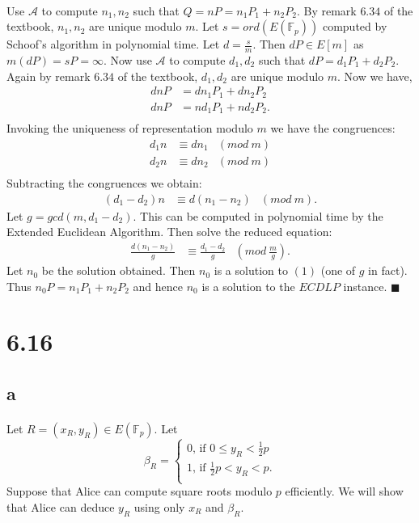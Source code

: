 \documentclass[letterpaper,12pt,oneside,onecolumn]{report}
\begin{document}
\paragraph{}
Use $\mathcal{A}$ to compute $n_1, n_2$ such that $Q = nP = n_1P_1 + n_2P_2$. By remark $6.34$ of the textbook, $n_1, n_2$ are unique modulo $m$. Let $s = ord(E(\mathbb{F}_p))$ computed by Schoof's algorithm in polynomial time. Let $d = \frac{s}{m}$. Then $dP \in E[m]$ as $m(dP) = sP = \infty$. Now use $\mathcal{A}$ to compute $d_1, d_2$ such that $dP = d_1P_1 + d_2P_2$. Again by remark $6.34$ of the textbook, $d_1, d_2$ are unique modulo $m$. Now we have,
\begin{align*}
dnP &= dn_1P_1 + dn_2P_2 \\
dnP &= nd_1P_1 + nd_2P_2.\\
\end{align*}
Invoking the uniqueness of representation modulo $m$ we have the congruences:
\begin{align*}
d_1n &\equiv dn_1 &(mod\ m)\\
d_2n &\equiv dn_2 &(mod\ m)\\
\end{align*}
Subtracting the congruences we obtain:
\begin{align}
(d_1 - d_2)n &\equiv d(n_1-n_2) &(mod\ m).
\end{align}
Let $g = gcd(m, d_1-d_2)$. This can be computed in polynomial time by the Extended Euclidean Algorithm. Then solve the reduced equation:
\begin{align*}
\frac{d(n_1 - n_2)}{g} &\equiv \frac{d_1 - d_2}{g} &(mod\ \frac{m}{g}).
\end{align*}
Let $n_0$ be the solution obtained. Then $n_0$ is a solution to $(1)$ (one of $g$ in fact). Thus $n_0P = n_1P_1 + n_2P_2$ and hence $n_0$ is a solution to the $ECDLP$ instance. $\blacksquare$
\section*{6.16}
\subsection*{a}
\paragraph{}
Let $R = (x_R, y_R) \in E(\mathbb{F}_p)$. Let
\begin{equation*}
\beta_R = \begin{cases}
0 \text{, if $0 \leq y_R < \frac{1}{2}p$}\\
1 \text{, if $\frac{1}{2}p < y_R < p$.}\\
\end{cases}
\end{equation*}
Suppose that Alice can compute square roots modulo $p$ efficiently. We will show that Alice can deduce $y_R$ using only $x_R$ and $\beta_R$. 
\end{document}
